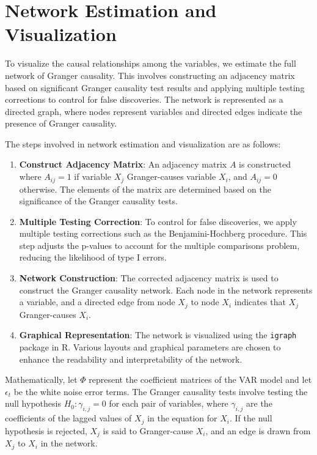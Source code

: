 \documentclass[11pt]{article}
\begin{document}
\section{Network Estimation and Visualization}
To visualize the causal relationships among the variables, we estimate the full network of Granger causality. This involves constructing an adjacency matrix based on significant Granger causality test results and applying multiple testing corrections to control for false discoveries. The network is represented as a directed graph, where nodes represent variables and directed edges indicate the presence of Granger causality.

The steps involved in network estimation and visualization are as follows:

\begin{enumerate}
    \item \textbf{Construct Adjacency Matrix}: An adjacency matrix \(A\) is constructed where \(A_{ij} = 1\) if variable \(X_j\) Granger-causes variable \(X_i\), and \(A_{ij} = 0\) otherwise. The elements of the matrix are determined based on the significance of the Granger causality tests.
    \item \textbf{Multiple Testing Correction}: To control for false discoveries, we apply multiple testing corrections such as the Benjamini-Hochberg procedure. This step adjusts the p-values to account for the multiple comparisons problem, reducing the likelihood of type I errors.
    \item \textbf{Network Construction}: The corrected adjacency matrix is used to construct the Granger causality network. Each node in the network represents a variable, and a directed edge from node \(X_j\) to node \(X_i\) indicates that \(X_j\) Granger-causes \(X_i\).
    \item \textbf{Graphical Representation}: The network is visualized using the \texttt{igraph} package in R. Various layouts and graphical parameters are chosen to enhance the readability and interpretability of the network.
\end{enumerate}

Mathematically, let \(\Phi\) represent the coefficient matrices of the VAR model and let \(\epsilon_t\) be the white noise error terms. The Granger causality tests involve testing the null hypothesis \(H_0: \gamma_{i,j} = 0\) for each pair of variables, where \(\gamma_{i,j}\) are the coefficients of the lagged values of \(X_j\) in the equation for \(X_i\). If the null hypothesis is rejected, \(X_j\) is said to Granger-cause \(X_i\), and an edge is drawn from \(X_j\) to \(X_i\) in the network.
\end{document}
